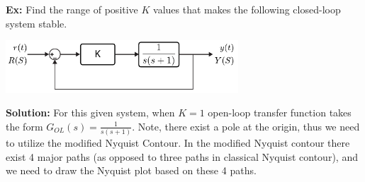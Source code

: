 \documentclass{article}
\begin{document}
\newpage

\textbf{Ex:} Find the range of positive $K$ values that makes the
following closed-loop system stable. 

\vspace{12 pt}

  \begin{minipage}[h]{1\linewidth}
    \begin{center}
      \includegraphics[width=0.65\textwidth]{figs/ex5block}
    \end{center}
  \end{minipage}

\vspace{12 pt}

\textbf{Solution:} For this given system, when $K = 1$ open-loop
transfer function takes the form $ G_{OL}(s) = \frac{1}{s (s+1) }$. Note, there exist a pole at the origin, thus 
we need to utilize the modified Nyquist Contour. 
In the modified Nyquist contour there exist 4 major paths (as opposed to three paths in classical Nyquist contour), 
and we need to draw the Nyquist plot based on these 4 paths. 
\end{document}
